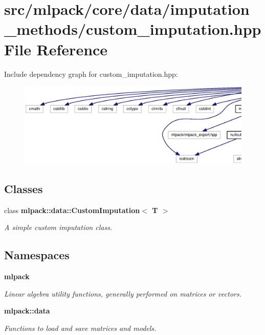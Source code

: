 \section{src/mlpack/core/data/imputation\+\_\+methods/custom\+\_\+imputation.hpp File Reference}
\label{custom__imputation_8hpp}
Include dependency graph for custom\+\_\+imputation.\+hpp\+:
\nopagebreak
\begin{figure}[H]
\begin{center}
\leavevmode
\includegraphics[width=350pt]{custom__imputation_8hpp__incl}
\end{center}
\end{figure}
\subsection*{Classes}
\begin{DoxyCompactItemize}
\item 
class {\bf mlpack\+::data\+::\+Custom\+Imputation$<$ T $>$}
\begin{DoxyCompactList}\small\item\em A simple custom imputation class. \end{DoxyCompactList}\end{DoxyCompactItemize}
\subsection*{Namespaces}
\begin{DoxyCompactItemize}
\item 
 {\bf mlpack}
\begin{DoxyCompactList}\small\item\em Linear algebra utility functions, generally performed on matrices or vectors. \end{DoxyCompactList}\item 
 {\bf mlpack\+::data}
\begin{DoxyCompactList}\small\item\em Functions to load and save matrices and models. \end{DoxyCompactList}\end{DoxyCompactItemize}


